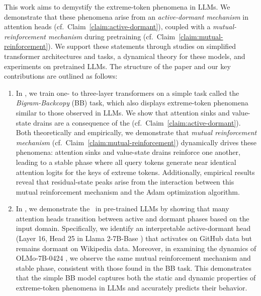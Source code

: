 This work aims to demystify the extreme-token phenomena in LLMs. We demonstrate that these phenomena arise from an \textit{active-dormant mechanism} in attention heads (cf.\ Claim~\ref{claim:active-dormant}), coupled with a \textit{mutual-reinforcement mechanism} during pretraining (cf.\ Claim~\ref{claim:mutual-reinforcement}). We support these statements through studies on simplified transformer architectures and tasks, a dynamical theory for these models, and experiments on pretrained LLMs. The structure of the paper and our key contributions are outlined as follows:
\begin{enumerate}[leftmargin=2em]
\setlength\itemsep{0pt}
\item In ,  we train one- to three-layer transformers on a simple task called the \textit{Bigram-Backcopy} (BB) task, which also displays extreme-token phenomena similar to those observed in LLMs. We show that attention sinks and value-state drains are a consequence of the \textit{\activedormant} (cf.\ Claim~\ref{claim:active-dormant}). Both theoretically and empirically, we demonstrate that \textit{mutual reinforcement mechanism} (cf.\ Claim~\ref{claim:mutual-reinforcement}) dynamically drives these phenomena: attention sinks and value-state drains reinforce one another, leading to a stable phase where all query tokens generate near identical attention logits for the keys of extreme tokens. Additionally, empirical results reveal that residual-state peaks arise from the interaction between this mutual reinforcement mechanism and the Adam optimization algorithm. 
\item In , we demonstrate the \textit{\activedormant}~in pre-trained LLMs by showing that many attention heads transition between active and dormant phases based on the input domain. Specifically, we identify an interpretable active-dormant head (Layer 16, Head 25 in Llama 2-7B-Base \citep{touvron2023llama}) that activates on GitHub data but remains dormant on Wikipedia data. Moreover, in examining the dynamics of OLMo-7B-0424 \citep{groeneveld2024olmo}, we observe the same mutual reinforcement mechanism and stable phase, consistent with those found in the BB task. This demonstrates that the simple BB model captures both the static and dynamic properties of extreme-token phenomena in LLMs and accurately predicts their behavior. 

\end{enumerate}
